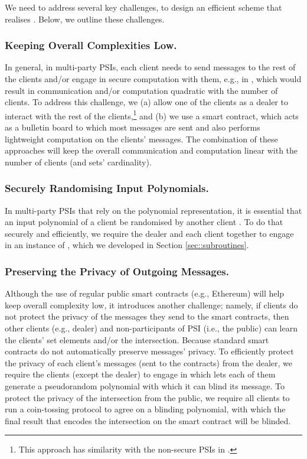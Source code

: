  We need to address several key challenges, to design an efficient scheme that realises \p. Below, we outline these challenges.
 
 
 \subsubsection{Keeping Overall Complexities Low.}
 
 In general, in multi-party PSIs, each client needs to send messages to the rest of the clients and/or engage in secure computation with them, e.g., in \cite{DBLP:conf/scn/InbarOP18,DBLP:conf/ccs/KolesnikovMPRT17}, which would result in communication and/or computation quadratic with the number of clients. To address this challenge, we  (a) allow one of the clients as a dealer to interact with the rest of the clients,\footnote{This approach has similarity with the non-secure PSIs in \cite{GhoshN19}.} and   (b) we use a smart contract, which acts as a bulletin board to which most messages are sent and also performs lightweight computation on the clients' messages. The combination of these approaches will keep the overall communication and computation linear with the number of clients (and sets' cardinality). 
 
 
 
 
 \subsubsection{Securely Randomising Input Polynomials.}  In multi-party PSIs that rely on the polynomial representation, it is essential that an input polynomial of a client be randomised by another client \cite{AbadiMZ21}. To do that securely and efficiently, we require the dealer and each client together to engage in an instance of \vopr, which we developed in Section \ref{sec::subroutines}. 
 
 \subsubsection{Preserving the Privacy of Outgoing Messages.} Although the use of regular public smart contracts (e.g., Ethereum) will help keep overall complexity low, it introduces another challenge; namely, if clients do not protect the privacy of the messages they send to the smart contracts, then other clients (e.g., dealer) and non-participants of PSI (i.e., the public) can learn the clients' set elements and/or the intersection. Because standard smart contracts do not automatically preserve messages' privacy. To efficiently protect the privacy of each client's messages (sent to the contracts) from the dealer, we require the clients (except the dealer) to engage in \zspaa which lets each of them generate a pseudorandom polynomial with which it can blind its message. To protect the privacy of the intersection from the public, we require all clients to run a coin-tossing protocol to agree on a blinding polynomial, with which the final result that encodes the intersection on the smart contract will be blinded.  
 
